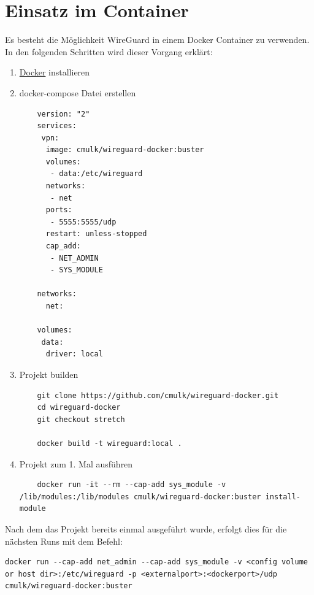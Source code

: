 \section{Einsatz im Container}
Es besteht die Möglichkeit WireGuard in einem Docker Container zu verwenden. In den folgenden Schritten wird dieser Vorgang erklärt:
\begin{enumerate}
    \item \href{https://docs.docker.com/docker-for-windows/install/}{Docker} installieren
    \item docker-compose Datei erstellen \newline
    \begin{lstlisting}
    version: "2"
    services:
     vpn:
      image: cmulk/wireguard-docker:buster
      volumes:
       - data:/etc/wireguard
      networks:
       - net
      ports:
       - 5555:5555/udp
      restart: unless-stopped
      cap_add:
       - NET_ADMIN
       - SYS_MODULE
    
    networks:
      net:
    
    volumes:
     data:
      driver: local\end{lstlisting}
    \item Projekt builden
    \begin{lstlisting}
    git clone https://github.com/cmulk/wireguard-docker.git
    cd wireguard-docker
    git checkout stretch 
    
    docker build -t wireguard:local .
    \end{lstlisting}
    \item Projekt zum 1. Mal ausführen
    \begin{lstlisting}
    docker run -it --rm --cap-add sys_module -v /lib/modules:/lib/modules cmulk/wireguard-docker:buster install-module 
    \end{lstlisting}
\end{enumerate}
Nach dem das Projekt bereits einmal ausgeführt wurde, erfolgt dies für die nächsten Runs mit dem Befehl:
\begin{lstlisting}
docker run --cap-add net_admin --cap-add sys_module -v <config volume or host dir>:/etc/wireguard -p <externalport>:<dockerport>/udp cmulk/wireguard-docker:buster
\end{lstlisting}

